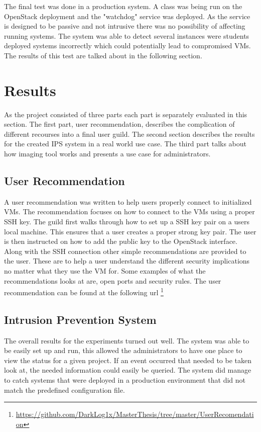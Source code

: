 \documentclass[12pt]{article}
\begin{document}
The final test was done in a production system. A class was being run on the OpenStack deployment and the "watchdog" service was deployed. As the service is designed to be passive and not intrusive there was no possibility of affecting running systems. The system was able to detect several instances were students deployed systems incorrectly which could potentially lead to compromised VMs. The results of this test are talked about in the following section.

\section{Results}
As the project consisted of three parts each part is separately evaluated in this section. The first part, user recommendation, describes the complication of different recourses into a final user guild. The second section describes the results for the created IPS system in a real world use case. The third part talks about how imaging tool works and presents a use case for administrators.

\subsection{User Recommendation}
A user recommendation was written to help users properly connect to initialized VMs. The recommendation focuses on how to connect to the VMs using a proper SSH key. The guild first walks through how to set up a SSH key pair on a users local machine. This ensures that a user creates a proper strong key pair. The user is then instructed on how to add the public key to the OpenStack interface. Along with the SSH connection other simple recommendations are provided to the user. These are to help a user understand the different security implications no matter what they use the VM for. Some examples of what the recommendations looks at are, open ports and security rules. The user recommendation can be found at the following url \footnote{\href{https://github.com/DarkLog1x/MasterThesis/tree/master/UserRecomendation}{https://github.com/DarkLog1x/MasterThesis/tree/master/UserRecomendation}}

\subsection{Intrusion Prevention System}
The overall results for the experiments turned out well. The system was able to be easily set up and run, this allowed the administrators to have one place to view the status for a given project. If an event occurred that needed to be taken look at, the needed information could easily be queried. The system did manage to catch systems that were deployed in a production environment that did not match the predefined configuration file.
\end{document}
